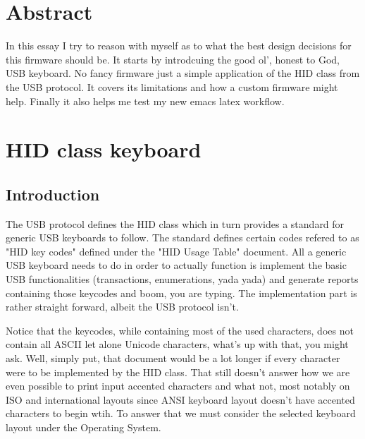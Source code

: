 \documentclass[11pt]{article}
\date{\today}
\title{}
\begin{document}
\tableofcontents

\section{Abstract}
\label{sec:orgc094ef9}
In this essay I try to reason with myself as to what the best design decisions for this firmware should be. It starts by introdcuing the good ol', honest to God, USB keyboard. No fancy firmware just a simple application of the HID class from the USB protocol. It covers its limitations and how a custom firmware might help. Finally it also helps me test my new emacs latex workflow.

\section{HID class keyboard}
\label{sec:org571b376}
\subsection{Introduction}
\label{sec:orgd2452f8}
The USB protocol defines the HID class which in turn provides a standard for generic USB keyboards to follow. The standard defines certain codes refered to as "HID key codes" defined under the "HID Usage Table" document. All a generic USB keyboard needs to do in order to actually function is implement the basic USB functionalities (transactions, enumerations, yada yada) and generate reports containing those keycodes and boom, you are typing. The implementation part is rather straight forward, albeit the USB protocol isn't. 

Notice that the keycodes, while containing most of the used characters, does not contain all ASCII let alone Unicode characters, what's up with that, you might ask. Well, simply put, that document would be a lot longer if every character were to be implemented by the HID class. That still doesn't answer how we are even possible to print input accented characters and what not, most notably on ISO and international layouts since ANSI keyboard layout doesn't have accented characters to begin wtih. To answer that we must consider the selected keyboard layout under the Operating System.
\end{document}
